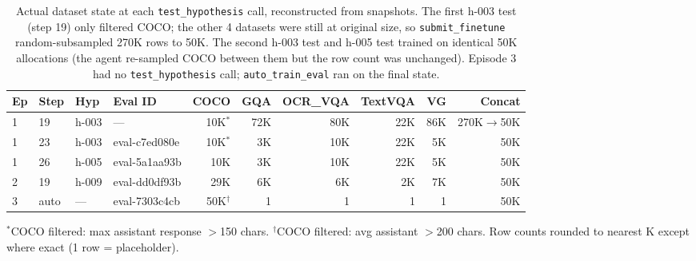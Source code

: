 \begin{table}[H]
\centering
\small
\caption{Actual dataset state at each \texttt{test\_hypothesis} call, reconstructed from snapshots. The first h-003 test (step 19) only filtered COCO; the other 4 datasets were still at original size, so \texttt{submit\_finetune} random-subsampled 270K rows to 50K. The second h-003 test and h-005 test trained on identical 50K allocations (the agent re-sampled COCO between them but the row count was unchanged). Episode 3 had no \texttt{test\_hypothesis} call; \texttt{auto\_train\_eval} ran on the final state.}
\label{tab:hyp-actual}
\begin{tabular}{llllrrrrrr}
\toprule
Ep & Step & Hyp & Eval ID & COCO & GQA & OCR\_VQA & TextVQA & VG & Concat \\
\midrule
1 & 19 & h-003 & --- & 10K$^*$ & 72K & 80K & 22K & 86K & 270K$\to$50K \\
1 & 23 & h-003 & eval-c7ed080e & 10K$^*$ & 3K & 10K & 22K & 5K & 50K \\
1 & 26 & h-005 & eval-5a1aa93b & 10K & 3K & 10K & 22K & 5K & 50K \\
2 & 19 & h-009 & eval-dd0df93b & 29K & 6K & 6K & 2K & 7K & 50K \\
3 & auto & --- & eval-7303c4cb & 50K$^\dagger$ & 1 & 1 & 1 & 1 & 50K \\
\bottomrule
\end{tabular}

\vspace{4pt}
{\footnotesize $^*$COCO filtered: max assistant response $>$150 chars. $^\dagger$COCO filtered: avg assistant $>$200 chars. Row counts rounded to nearest K except where exact (1 row = placeholder).}
\end{table}

